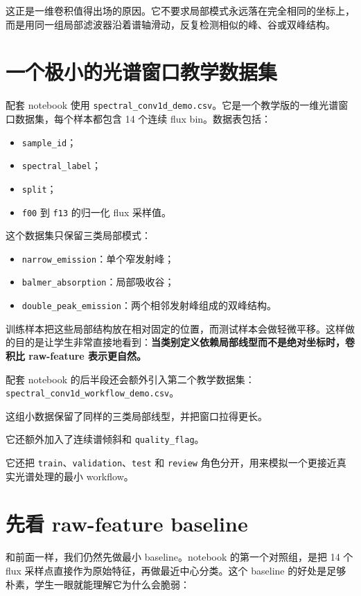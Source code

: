 这正是一维卷积值得出场的原因。它不要求局部模式永远落在完全相同的坐标上，而是用同一组局部滤波器沿着谱轴滑动，反复检测相似的峰、谷或双峰结构。

\section{一个极小的光谱窗口教学数据集}

配套 notebook 使用 \nolinkurl{spectral_conv1d_demo.csv}。它是一个教学版的一维光谱窗口数据集，每个样本都包含 14 个连续 flux bin。数据表包括：

\begin{itemize}
    \item \texttt{sample\_id}；
    \item \texttt{spectral\_label}；
    \item \texttt{split}；
    \item \texttt{f00} 到 \texttt{f13} 的归一化 flux 采样值。
\end{itemize}

这个数据集只保留三类局部模式：

\begin{itemize}
    \item \texttt{narrow\_emission}：单个窄发射峰；
    \item \texttt{balmer\_absorption}：局部吸收谷；
    \item \texttt{double\_peak\_emission}：两个相邻发射峰组成的双峰结构。
\end{itemize}

训练样本把这些局部结构放在相对固定的位置，而测试样本会做轻微平移。这样做的目的是让学生非常直接地看到：\textbf{当类别定义依赖局部线型而不是绝对坐标时，卷积比 raw-feature 表示更自然。}

配套 notebook 的后半段还会额外引入第二个教学数据集：\nolinkurl{spectral_conv1d_workflow_demo.csv}。

这组小数据保留了同样的三类局部线型，并把窗口拉得更长。

它还额外加入了连续谱倾斜和 \texttt{quality\_flag}。

它还把 \texttt{train}、\texttt{validation}、\texttt{test} 和 \texttt{review} 角色分开，用来模拟一个更接近真实光谱处理的最小 workflow。

\section{先看 raw-feature baseline}

和前面一样，我们仍然先做最小 baseline。notebook 的第一个对照组，是把 14 个 flux 采样点直接作为原始特征，再做最近中心分类。这个 baseline 的好处是足够朴素，学生一眼就能理解它为什么会脆弱：

